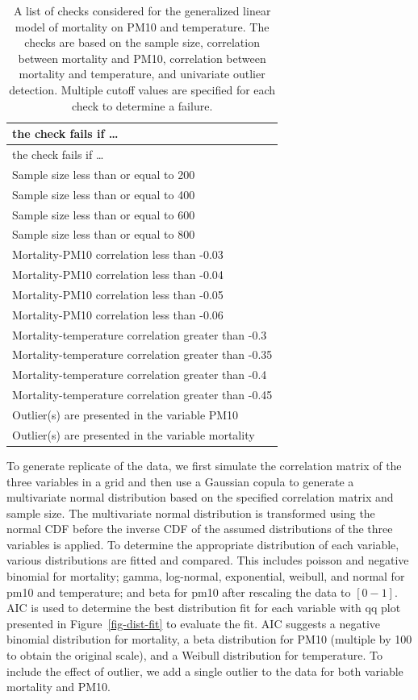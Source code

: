 \documentclass[
  12pt,
]{interact}
\begin{document}
\begin{longtable}[]{@{}l@{}}
\caption{A list of checks considered for the generalized linear model of
mortality on PM10 and temperature. The checks are based on the sample
size, correlation between mortality and PM10, correlation between
mortality and temperature, and univariate outlier detection. Multiple
cutoff values are specified for each check to determine a
failure.}\label{tbl-checks}\tabularnewline
\toprule\noalign{}
the check fails if \ldots{} \\
\midrule\noalign{}
\endfirsthead
\toprule\noalign{}
the check fails if \ldots{} \\
\midrule\noalign{}
\endhead
\bottomrule\noalign{}
\endlastfoot
Sample size less than or equal to 200 \\
Sample size less than or equal to 400 \\
Sample size less than or equal to 600 \\
Sample size less than or equal to 800 \\
Mortality-PM10 correlation less than -0.03 \\
Mortality-PM10 correlation less than -0.04 \\
Mortality-PM10 correlation less than -0.05 \\
Mortality-PM10 correlation less than -0.06 \\
Mortality-temperature correlation greater than -0.3 \\
Mortality-temperature correlation greater than -0.35 \\
Mortality-temperature correlation greater than -0.4 \\
Mortality-temperature correlation greater than -0.45 \\
Outlier(s) are presented in the variable PM10 \\
Outlier(s) are presented in the variable mortality \\
\end{longtable}

To generate replicate of the data, we first simulate the correlation
matrix of the three variables in a grid and then use a Gaussian copula
to generate a multivariate normal distribution based on the specified
correlation matrix and sample size. The multivariate normal distribution
is transformed using the normal CDF before the inverse CDF of the
assumed distributions of the three variables is applied. To determine
the appropriate distribution of each variable, various distributions are
fitted and compared. This includes poisson and negative binomial for
mortality; gamma, log-normal, exponential, weibull, and normal for pm10
and temperature; and beta for pm10 after rescaling the data to
\([0-1]\). AIC is used to determine the best distribution fit for each
variable with qq plot presented in Figure~\ref{fig-dist-fit} to evaluate
the fit. AIC suggests a negative binomial distribution for mortality, a
beta distribution for PM10 (multiple by 100 to obtain the original
scale), and a Weibull distribution for temperature. To include the
effect of outlier, we add a single outlier to the data for both variable
mortality and PM10.
\end{document}
